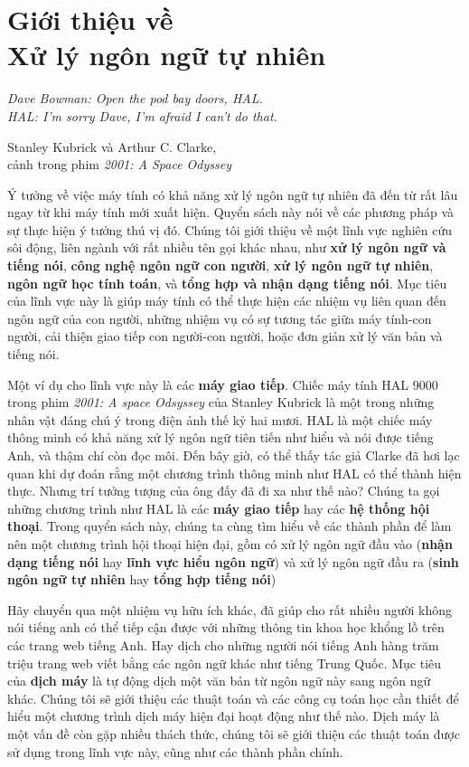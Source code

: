 \setcounter{chapter}{0}

\chapter{Giới thiệu về\\ Xử lý ngôn ngữ tự nhiên}

\setlength{}
\epigraphfontsize{\small}
\epigraph{
\itshape Dave Bowman: Open the pod bay doors, HAL.\\
HAL: I'm sorry Dave, I'm afraid I can't do that.\\
}{Stanley Kubrick và Arthur C. Clarke,\\
cảnh trong phim \textit{2001: A Space Odyssey}}

Ý tưởng về việc máy tính có khả năng xử lý ngôn ngữ tự nhiên đã đến từ rất lâu ngay từ khi máy tính mới xuất hiện. Quyển sách này nói về các phương pháp và sự thực hiện ý tưởng thú vị đó. Chúng tôi giới thiệu về một lĩnh vực nghiên cứu sôi động, liên ngành với rất nhiều tên gọi khác nhau, như \textbf{xử lý ngôn ngữ và tiếng nói}, \textbf{công nghệ ngôn ngữ con người}, \textbf{xử lý ngôn ngữ tự nhiên}, \textbf{ngôn ngữ học tính toán}, và \textbf{tổng hợp và nhận dạng tiếng nói}. Mục tiêu của lĩnh vực này là giúp máy tính có thể thực hiện các nhiệm vụ liên quan đến ngôn ngữ của con người, những nhiệm vụ có sự tương tác giữa máy tính-con người, cải thiện giao tiếp con người-con người, hoặc đơn giản xử lý văn bản và tiếng nói.

Một ví dụ cho lĩnh vực này là các \textbf{máy giao tiếp}. Chiếc máy tính HAL 9000 trong phim \textit{2001: A space Odsyssey} của Stanley Kubrick là một trong những nhân vật đáng chú ý trong điện ảnh thế kỷ hai mươi. HAL là một chiếc máy thông minh có khả năng xử lý ngôn ngữ tiên tiến như hiểu và nói được tiếng Anh, và thậm chí còn đọc môi. Đến bây giờ, có thể thấy tác giả Clarke đã hơi lạc quan khi dự đoán rằng một chương trình thông minh như HAL có thể thành hiện thực. Nhưng trí tưởng tượng của ông đấy đã đi xa như thế nào? Chúng ta gọi những chương trình như HAL là các \textbf{máy giao tiếp} hay các \textbf{hệ thống hội thoại}. Trong quyển sách này, chúng ta cùng tìm hiểu về các thành phần để làm nên một chương trình hội thoại hiện đại, gồm có xử lý ngôn ngữ đầu vào (\textbf{nhận dạng tiếng nói} hay \textbf{lĩnh vực hiểu ngôn ngữ}) và xử lý ngôn ngữ đầu ra (\textbf{sinh ngôn ngữ tự nhiên} hay \textbf{tổng hợp tiếng nói})

Hãy chuyển qua một nhiệm vụ hữu ích khác, đã giúp cho rất nhiều người không nói tiếng anh có thể tiếp cận được với những thông tin khoa học khổng lồ trên các trang web tiếng Anh. Hay dịch cho những người nói tiếng Anh hàng trăm triệu trang web viết bằng các ngôn ngữ khác như tiếng Trung Quốc. Mục tiêu của \textbf{dịch máy} là tự động dịch một văn bản từ ngôn ngữ này sang ngôn ngữ khác. Chúng tôi sẽ giới thiệu các thuật toán và các công cụ toán học cần thiết để hiểu một chương trình dịch máy hiện đại hoạt động như thế nào. Dịch máy là một vấn đề còn gặp nhiều thách thức, chúng tôi sẽ giới thiệu các thuật toán được sử dụng trong lĩnh vực này, cũng như các thành phần chính.

